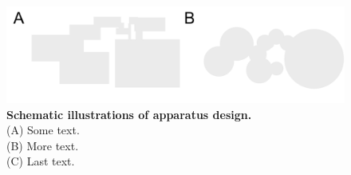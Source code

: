 
\newpage

\begin{figure}
\centering
\begin{subcaptiongroup}
\label{fig:1A} %
\label{fig:1B} %
\end{subcaptiongroup}
\includegraphics[width=1\textwidth]{figures/sampfig.png}
\caption{{\textbf{Schematic illustrations of apparatus design.}}\\
(A)
Some text.\\
(B)
More text.\\
(C) 
Last text.
}
\label{fig:F1}

\end{figure}


\beginsupplement %
